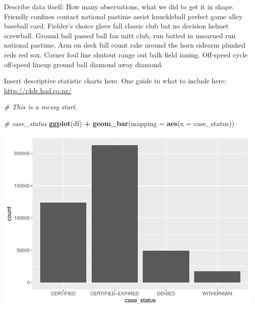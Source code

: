 \documentclass[]{article}
\newenvironment{Shaded}{\begin{snugshade}}{\end{snugshade}}
\newcommand{\KeywordTok}[1]{\textcolor[rgb]{0.13,0.29,0.53}{\textbf{#1}}}
\newcommand{\DataTypeTok}[1]{\textcolor[rgb]{0.13,0.29,0.53}{#1}}
\newcommand{\StringTok}[1]{\textcolor[rgb]{0.31,0.60,0.02}{#1}}
\newcommand{\CommentTok}[1]{\textcolor[rgb]{0.56,0.35,0.01}{\textit{#1}}}
\newcommand{\OperatorTok}[1]{\textcolor[rgb]{0.81,0.36,0.00}{\textbf{#1}}}
\newcommand{\NormalTok}[1]{#1}
\begin{document}
Describe data itself: How many observations, what we did to get it in
shape. Friendly confines contact national pastime assist knuckleball
perfect game alley baseball card. Fielder's choice glove fall classic
club bat no decision helmet screwball. Ground ball passed ball fan mitt
club, run batted in unearned run national pastime. Arm on deck full
count rake around the horn sidearm plunked reds red sox. Corner foul
line shutout range out balk field inning. Off-speed cycle off-speed
lineup ground ball diamond away diamond.

Insert descriptive statistic charts here. One guide to what to include
here: \url{http://r4ds.had.co.nz/}

\begin{Shaded}
\begin{Highlighting}[]
\CommentTok{# This is a messy start. }

\CommentTok{# case_status}
\KeywordTok{ggplot}\NormalTok{(df) }\OperatorTok{+}
\StringTok{  }\KeywordTok{geom_bar}\NormalTok{(}\DataTypeTok{mapping =} \KeywordTok{aes}\NormalTok{(}\DataTypeTok{x =}\NormalTok{ case_status))}
\end{Highlighting}
\end{Shaded}

\includegraphics{Report_Dummy_files/figure-latex/variable-specific exploratory data analysis-1.pdf}

\begin{Shaded}
\end{Shaded}
\end{document}
